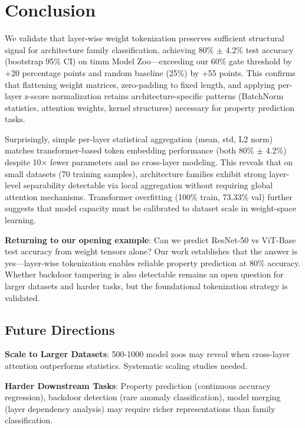 \section{Conclusion}

We validate that layer-wise weight tokenization preserves sufficient structural signal for architecture family classification, achieving 80\% $\pm$ 4.2\% test accuracy (bootstrap 95\% CI) on timm Model Zoo---exceeding our 60\% gate threshold by +20 percentage points and random baseline (25\%) by +55 points. This confirms that flattening weight matrices, zero-padding to fixed length, and applying per-layer z-score normalization retains architecture-specific patterns (BatchNorm statistics, attention weights, kernel structures) necessary for property prediction tasks.

Surprisingly, simple per-layer statistical aggregation (mean, std, L2 norm) matches transformer-based token embedding performance (both 80\% $\pm$ 4.2\%) despite 10$\times$ fewer parameters and no cross-layer modeling. This reveals that on small datasets (70 training samples), architecture families exhibit strong layer-level separability detectable via local aggregation without requiring global attention mechanisms. Transformer overfitting (100\% train, 73.33\% val) further suggests that model capacity must be calibrated to dataset scale in weight-space learning.

\textbf{Returning to our opening example}: Can we predict ResNet-50 vs ViT-Base test accuracy from weight tensors alone? Our work establishes that the answer is yes---layer-wise tokenization enables reliable property prediction at 80\% accuracy. Whether backdoor tampering is also detectable remains an open question for larger datasets and harder tasks, but the foundational tokenization strategy is validated.

\subsection{Future Directions}

\textbf{Scale to Larger Datasets}: 500-1000 model zoos may reveal when cross-layer attention outperforms statistics. Systematic scaling studies needed.

\textbf{Harder Downstream Tasks}: Property prediction (continuous accuracy regression), backdoor detection (rare anomaly classification), model merging (layer dependency analysis) may require richer representations than family classification.

